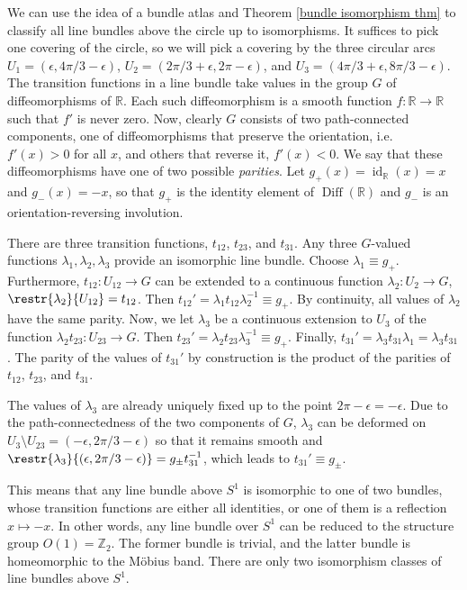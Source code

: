\documentclass[english,letterpaper]{article}%
\numberwithin{equation}{section}
\numberwithin{figure}{section}
\numberwithin{table}{section}
\theoremstyle{definition}
\theoremstyle{definition}
\theoremstyle{definition}
\theoremstyle{plain}
\theoremstyle{plain}
\theoremstyle{plain}
\theoremstyle{plain}
\theoremstyle{remark}
\theoremstyle{remark}
\DeclareMathOperator{\id}{id}
\DeclareMathOperator{\Diff}{Diff}
\begin{document}
\begin{example}\label{line bundles over S1}
    We can use the idea of a bundle atlas and Theorem \ref{bundle isomorphism thm} to classify all line bundles above the circle up to isomorphisms. It suffices to pick one covering of the circle, so we will pick a covering by the three circular arcs $U_1=(\epsilon,4\pi/3-\epsilon)$, $U_2=(2\pi/3+\epsilon,2\pi-\epsilon)$, and $U_3=(4\pi/3+\epsilon,8\pi/3-\epsilon)$. The transition functions in a line bundle take values in the group $G$ of diffeomorphisms of $\mathbb{R}$. Each such diffeomorphism is a smooth function $f:\mathbb{R}\to\mathbb{R}$ such that $f'$ is never zero. Now, clearly $G$ consists of two path-connected components, one of diffeomorphisms that preserve the orientation, i.e.\ $f'(x)>0$ for all $x$, and others that reverse it, $f'(x)<0$. We say that these diffeomorphisms have one of two possible \emph{parities}. Let $g_+(x)=\id_{\mathbb{R}}(x)=x$ and $g_-(x)=-x$, so that $g_+$ is the identity element of $\Diff(\mathbb{R})$ and $g_-$ is an orientation-reversing involution.

    There are three transition functions, $t_{12}$, $t_{23}$, and $t_{31}$. Any three $G$-valued functions $\lambda_1,\lambda_2,\lambda_3$ provide an isomorphic line bundle. Choose $\lambda_1\equiv g_+$. Furthermore, $t_{12}:U_{12}\to G$ can be extended to a continuous function $\lambda_2: U_2\to G$, $\restr{\lambda_2}{U_{12}}=t_{12}$. Then $t_{12}'=\lambda_1 t_{12}\lambda_2^{-1}\equiv g_+$. By continuity, all values of $\lambda_2$ have the same parity.  Now, we let $\lambda_3$ be a continuous extension to $U_3$ of the function $\lambda_2 t_{23}:U_{23}\to G$. Then $t_{23}'=\lambda_2 t_{23} \lambda_3^{-1}\equiv g_+$. Finally, $t_{31}'=\lambda_3 t_{31} \lambda_1=\lambda_3 t_{31}$.  The parity of the values of $t_{31}'$ by construction is the product of the parities of $t_{12}$, $t_{23}$, and $t_{31}$.

    The values of $\lambda_3$ are already uniquely fixed up to the point $2\pi-\epsilon=-\epsilon$. Due to the path-connectedness of the two components of $G$, $\lambda_3$ can be deformed on $U_3\setminus U_{23}=(-\epsilon,2\pi/3-\epsilon)$ so that it remains smooth and $\restr{\lambda_3}{(\epsilon,2\pi/3-\epsilon)}=g_\pm t_{31}^{-1}$, which leads to $t_{31}'\equiv g_\pm$.

    This means that any line bundle above $S^1$ is isomorphic to one of two bundles, whose transition functions are either all identities, or one of them is a reflection $x\mapsto -x$.  In other words, any line bundle over $S^1$ can be reduced to the structure group $O(1)=\mathbb{Z}_2$. The former bundle is trivial, and the latter bundle is homeomorphic to the M\"obius band. There are only two isomorphism classes of line bundles above $S^1$.
\end{example}
\end{document}
